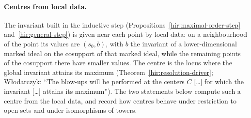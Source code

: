 \paragraph{Centres from local data.} The invariant built in the inductive step (Propositions~\ref{hir:maximal-order-step} and~\ref{hir:general-step})
is given near each point by local data: on a neighbourhood of the point its values are \((s_0,b)\), with \(b\) the invariant of a lower-dimensional
marked ideal on the cosupport of that marked ideal, while the remaining points of the cosupport there have smaller values. The centre is the
locus where the global invariant attains its maximum (Theorem~\ref{hir:resolution-driver}; Włodarczyk: ``The blow-ups will be performed at the
centers \(C\) [\dots] for which the invariant [\dots] attains its maximum''). The two statements below compute such a centre from the local data,
and record how centres behave under restriction to open sets and under isomorphisms of towers.

